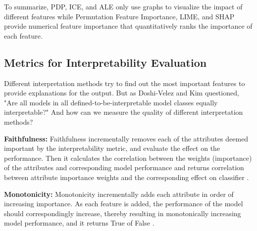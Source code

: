To summarize, PDP, ICE, and ALE only use graphs to visualize the impact of different features while Permutation Feature Importance, LIME, and SHAP provide numerical feature importance that quantitatively ranks the importance of each feature.


\subsection{Metrics for Interpretability Evaluation}

Different interpretation methods try to find out the most important features to provide explanations for the output. But as Doshi-Velez and Kim questioned, "Are all models in all defined-to-be-interpretable model classes equally interpretable?"  \citep{doshivelez2017rigorous} And how can we measure the quality of different interpretation methods? 


\textbf{Faithfulness:} Faithfulness incrementally removes each of the attributes deemed important by the interpretability metric, and evaluate the effect on the performance. Then it calculates the correlation between the weights (importance) of the attributes and corresponding model performance and returns correlation between attribute importance weights and the corresponding effect on classifier \citep{alvarezmelis2018robust}.

\textbf{Monotonicity:} Monotonicity incrementally adds each attribute in order of increasing importance. As each feature is added, the performance of the model should correspondingly increase, thereby resulting in monotonically increasing model performance, and it returns True of False \citep{luss2019generating}.
\color{black}


